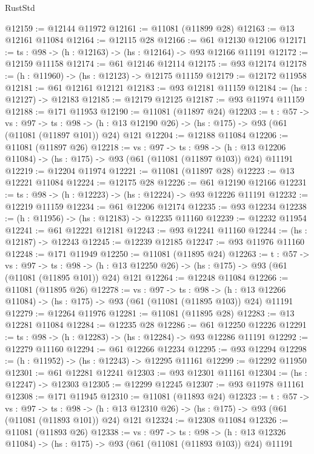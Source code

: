 \begin{lexlean}{RustStd}
\begin{coremodule}
@12159 := @12144 @11972
@12161 := @11081 (@11899 @28)
@12163 := @13 @12161 @11084
@12164 := @12115 @28
@12166 := @61 @12130 @12106
@12171 := {ts : @98} -> (h : @12163) -> (hs : @12164) -> @93 @12166 @11191
@12172 := @12159 @11158
@12174 := @61 @12146 @12114
@12175 := @93 @12174
@12178 := (h : @11960) -> (hs : @12123) -> @12175 @11159
@12179 := @12172 @11958
@12181 := @61 @12161 @12121
@12183 := @93 @12181 @11159
@12184 := (hs : @12127) -> @12183
@12185 := @12179 @12125
@12187 := @93 @11974 @11159
@12188 := @171 @11953
@12190 := @11081 (@11897 @24)
@12203 := {t : @57} ->
  {vs : @97} ->
  {ts : @98} -> (h : @13 @12190 @26) -> (hs : @175) -> @93 (@61 (@11081 (@11897 @101)) @24) @121
@12204 := @12188 @11084
@12206 := @11081 (@11897 @26)
@12218 := {vs : @97} ->
  {ts : @98} ->
  (h : @13 @12206 @11084) -> (hs : @175) -> @93 (@61 (@11081 (@11897 @103)) @24) @11191
@12219 := @12204 @11974
@12221 := @11081 (@11897 @28)
@12223 := @13 @12221 @11084
@12224 := @12175 @28
@12226 := @61 @12190 @12166
@12231 := {ts : @98} -> (h : @12223) -> (hs : @12224) -> @93 @12226 @11191
@12232 := @12219 @11159
@12234 := @61 @12206 @12174
@12235 := @93 @12234
@12238 := (h : @11956) -> (hs : @12183) -> @12235 @11160
@12239 := @12232 @11954
@12241 := @61 @12221 @12181
@12243 := @93 @12241 @11160
@12244 := (hs : @12187) -> @12243
@12245 := @12239 @12185
@12247 := @93 @11976 @11160
@12248 := @171 @11949
@12250 := @11081 (@11895 @24)
@12263 := {t : @57} ->
  {vs : @97} ->
  {ts : @98} -> (h : @13 @12250 @26) -> (hs : @175) -> @93 (@61 (@11081 (@11895 @101)) @24) @121
@12264 := @12248 @11084
@12266 := @11081 (@11895 @26)
@12278 := {vs : @97} ->
  {ts : @98} ->
  (h : @13 @12266 @11084) -> (hs : @175) -> @93 (@61 (@11081 (@11895 @103)) @24) @11191
@12279 := @12264 @11976
@12281 := @11081 (@11895 @28)
@12283 := @13 @12281 @11084
@12284 := @12235 @28
@12286 := @61 @12250 @12226
@12291 := {ts : @98} -> (h : @12283) -> (hs : @12284) -> @93 @12286 @11191
@12292 := @12279 @11160
@12294 := @61 @12266 @12234
@12295 := @93 @12294
@12298 := (h : @11952) -> (hs : @12243) -> @12295 @11161
@12299 := @12292 @11950
@12301 := @61 @12281 @12241
@12303 := @93 @12301 @11161
@12304 := (hs : @12247) -> @12303
@12305 := @12299 @12245
@12307 := @93 @11978 @11161
@12308 := @171 @11945
@12310 := @11081 (@11893 @24)
@12323 := {t : @57} ->
  {vs : @97} ->
  {ts : @98} -> (h : @13 @12310 @26) -> (hs : @175) -> @93 (@61 (@11081 (@11893 @101)) @24) @121
@12324 := @12308 @11084
@12326 := @11081 (@11893 @26)
@12338 := {vs : @97} ->
  {ts : @98} ->
  (h : @13 @12326 @11084) -> (hs : @175) -> @93 (@61 (@11081 (@11893 @103)) @24) @11191

\end{coremodule}
\end{lexlean}
